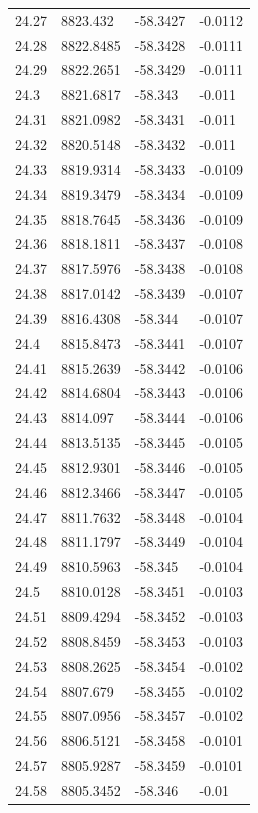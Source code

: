 \begin{table}[H]
\begin{tabular}{llll}
24.27 & 8823.432 & -58.3427 & -0.0112 \\
24.28 & 8822.8485 & -58.3428 & -0.0111 \\
24.29 & 8822.2651 & -58.3429 & -0.0111 \\
24.3 & 8821.6817 & -58.343 & -0.011 \\
24.31 & 8821.0982 & -58.3431 & -0.011 \\
24.32 & 8820.5148 & -58.3432 & -0.011 \\
24.33 & 8819.9314 & -58.3433 & -0.0109 \\
24.34 & 8819.3479 & -58.3434 & -0.0109 \\
24.35 & 8818.7645 & -58.3436 & -0.0109 \\
24.36 & 8818.1811 & -58.3437 & -0.0108 \\
24.37 & 8817.5976 & -58.3438 & -0.0108 \\
24.38 & 8817.0142 & -58.3439 & -0.0107 \\
24.39 & 8816.4308 & -58.344 & -0.0107 \\
24.4 & 8815.8473 & -58.3441 & -0.0107 \\
24.41 & 8815.2639 & -58.3442 & -0.0106 \\
24.42 & 8814.6804 & -58.3443 & -0.0106 \\
24.43 & 8814.097 & -58.3444 & -0.0106 \\
24.44 & 8813.5135 & -58.3445 & -0.0105 \\
24.45 & 8812.9301 & -58.3446 & -0.0105 \\
24.46 & 8812.3466 & -58.3447 & -0.0105 \\
24.47 & 8811.7632 & -58.3448 & -0.0104 \\
24.48 & 8811.1797 & -58.3449 & -0.0104 \\
24.49 & 8810.5963 & -58.345 & -0.0104 \\
24.5 & 8810.0128 & -58.3451 & -0.0103 \\
24.51 & 8809.4294 & -58.3452 & -0.0103 \\
24.52 & 8808.8459 & -58.3453 & -0.0103 \\
24.53 & 8808.2625 & -58.3454 & -0.0102 \\
24.54 & 8807.679 & -58.3455 & -0.0102 \\
24.55 & 8807.0956 & -58.3457 & -0.0102 \\
24.56 & 8806.5121 & -58.3458 & -0.0101 \\
24.57 & 8805.9287 & -58.3459 & -0.0101 \\
24.58 & 8805.3452 & -58.346 & -0.01 \\

\end{tabular}
\end{table}
